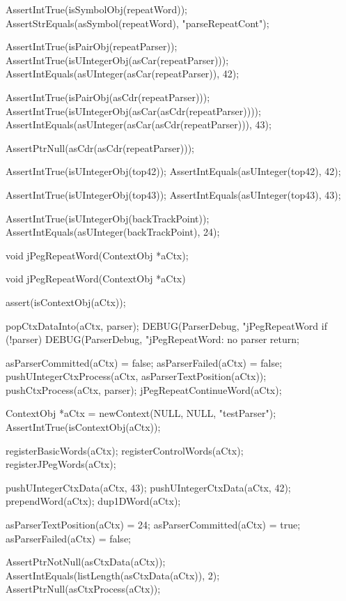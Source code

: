   AssertIntTrue(isSymbolObj(repeatWord));
  AssertStrEquals(asSymbol(repeatWord), "parseRepeatCont");
  
  AssertIntTrue(isPairObj(repeatParser));
  AssertIntTrue(isUIntegerObj(asCar(repeatParser)));
  AssertIntEquals(asUInteger(asCar(repeatParser)), 42);
  
  AssertIntTrue(isPairObj(asCdr(repeatParser)));
  AssertIntTrue(isUIntegerObj(asCar(asCdr(repeatParser))));
  AssertIntEquals(asUInteger(asCar(asCdr(repeatParser))), 43);
  
  AssertPtrNull(asCdr(asCdr(repeatParser)));
  
  AssertIntTrue(isUIntegerObj(top42));
  AssertIntEquals(asUInteger(top42), 42);  

  AssertIntTrue(isUIntegerObj(top43));
  AssertIntEquals(asUInteger(top43), 43);
  
  AssertIntTrue(isUIntegerObj(backTrackPoint));
  AssertIntEquals(asUInteger(backTrackPoint), 24);
\stopCTest
\stopTestCase
\stopTestSuite

\startTestSuite[jPegRepeatWord]

\startCHeader
void jPegRepeatWord(ContextObj *aCtx);
\stopCHeader

\startCCode
void jPegRepeatWord(ContextObj *aCtx) {
  assert(isContextObj(aCtx));
  
  popCtxDataInto(aCtx, parser);
  DEBUG(ParserDebug, "jPegRepeatWord%
  if (!parser) {
    DEBUG(ParserDebug, "jPegRepeatWord: no parser%
    return;
  }
  
  asParserCommitted(aCtx) = false;
  asParserFailed(aCtx)    = false;
  pushUIntegerCtxProcess(aCtx, asParserTextPosition(aCtx));
  pushCtxProcess(aCtx, parser);
  jPegRepeatContinueWord(aCtx);
}
\stopCCode


\startCTest
  ContextObj *aCtx = newContext(NULL, NULL, "testParser");
  AssertIntTrue(isContextObj(aCtx));
  
  registerBasicWords(aCtx);
  registerControlWords(aCtx);
  registerJPegWords(aCtx);
  
  pushUIntegerCtxData(aCtx, 43);
  pushUIntegerCtxData(aCtx, 42);
  prependWord(aCtx);
  dup1DWord(aCtx);
  
  asParserTextPosition(aCtx) = 24;
  asParserCommitted(aCtx)    = true;
  asParserFailed(aCtx)       = false;
  
  AssertPtrNotNull(asCtxData(aCtx));
  AssertIntEquals(listLength(asCtxData(aCtx)), 2);
  AssertPtrNull(asCtxProcess(aCtx));
  
